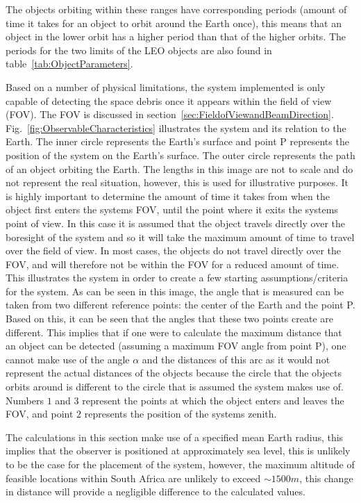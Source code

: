 \documentclass[11pt]{witseiepaper}
\begin{document}
The objects orbiting within these ranges have corresponding periods (amount of time it takes for an object to orbit around the Earth once), this means that an object in the lower orbit has a higher period than that of the higher orbits. The periods for the two limits of the LEO objects are also found in table~\ref{tab:ObjectParameters}.

Based on a number of physical limitations, the system implemented is only capable of detecting the space debris once it appears within the field of view (FOV). The FOV is discussed in section~\ref{sec:FieldofViewandBeamDirection}. Fig.~\ref{fig:ObservableCharacteristics} illustrates the system and its relation to the Earth.
The inner circle represents the Earth's surface and point P represents the position of the system on the Earth's surface.  
The outer circle represents the path of an object orbiting the Earth.
The lengths in this image are not to scale and do not represent the real situation, however, this is used for illustrative purposes.
It is highly important to determine the amount of time it takes from when the object first enters the systems FOV, until the point where it exits the systems point of view.
In this case it is assumed that the object travels directly over the boresight of the system and so it will take the maximum amount of time to travel over the field of view. In most cases, the objects do not travel directly over the FOV, and will therefore not be within the FOV for a reduced amount of time.
This illustrates the system in order to create a few starting assumptions/criteria for the system.
As can be seen in this image, the angle that is measured can be taken from two different reference points: the center of the Earth and the point P. Based on this, it can be seen that the angles that these two points create are different. This implies that if one were to calculate the maximum distance that an object can be detected (assuming a maximum FOV angle from point P), one cannot make use of the angle $\alpha$ and the distances of this arc as it would not represent the actual distances of the objects because the circle that the objects orbits around is different to the circle that is assumed the system makes use of.
Numbers $1$ and $3$ represent the points at which the object enters and leaves the FOV, and point $2$ represents the position of the systems zenith.


The calculations in this section make use of a specified mean Earth radius, this implies that the observer is positioned at approximately sea level, this is unlikely to be the case for the placement of the system, however, the maximum altitude of feasible locations within South Africa are unlikely to exceed $\sim 1500 m$, this change in distance will provide a negligible difference to the calculated values.
\end{document}
